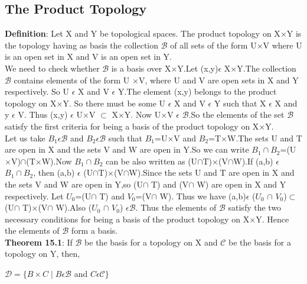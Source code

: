 \documentclass[a4paper,english,12pt]{article}
\begin{document}
\begin{flushleft}
\section{The Product Topology}
{\bf Definition}: Let X and Y be topological spaces. The product topology on X$\times$Y is the topology having as basis the collection $\mathscr{B}$ of all sets of the form U$\times$V where U is an open set in X and V is an open set in Y.\\
\vspace{1mm}
We need to check whether $\mathscr{B}$ is a basis over X$\times$Y.Let (x,y)$\epsilon$ X$\times$Y.The collection $\mathscr{B}$ contains elements of the form U $\times$V, where U and V are open sets in X and Y respectively. So U $\epsilon$ X and V $\epsilon$ Y.The element (x,y) belongs to the product topology on X$\times$Y. So there must be some U $\epsilon$ X and V $\epsilon$ Y such that X $\epsilon$ X and y $\epsilon$ V. Thus (x,y) $\epsilon$ U$\times$V $\subset$ X$\times$Y. Now U$\times$V $\epsilon$ $\mathscr{B}$.So the elements of the set $\mathscr{B}$ satisfy the first criteria for being a basis of the product topology on  X$\times$Y.\\
\vspace{1mm}
Let us take $B{_1}\epsilon\mathscr{B}$ and $B{_2}\epsilon\mathscr{B}$ such that $B{_1}$=U$\times$V and $B{_2}$=T$\times$W.The sets U and T are open in X and the sets V and W are open in Y.So we can write $B{_1}\cap B{_2}$=(U$\times$V)$\cap $(T$\times$W).Now $B{_1}\cap B{_2}$ can be also written as (U$\cap $T)$\times $(V$\cap $W).If (a,b) $\epsilon$ $B{_1}\cap B{_2}$, then (a,b) $\epsilon$ (U$\cap $T)$\times $(V$\cap $W).Since the sets
U and T are open in X and the sets V and W are open in Y,so (U$\cap$ T) and (V$\cap$ W) are open in X and Y respectively. Let $U_0$=(U$\cap$ T) and $V_0$=(V$\cap$ W). Thus we have (a,b)$\epsilon$ ($U_0$ $\cap $ $V_0$)$\subset$ (U$\cap$ T)$\times $(V$\cap$ W).Also ($U_0$ $\cap$ $V_0$) $\epsilon \mathscr{B}$. Thus the elements of $\mathscr{B}$ satisfy the two necessary conditions for being a basis of the product topology on X$\times$Y. Hence the elements of $\mathscr{B}$ form a basis.\\
\vspace{2mm}
{\bf Theorem 15.1}: If $\mathscr{B}$ be the basis for a topology on X and $\mathscr{C}$ be the basis for a topology on Y, then,\\
\vspace{1mm}
\begin{center}
$\mathscr{D}=\{B\times C\mid B \epsilon \mathscr{B}$ and $C \epsilon \mathscr{C}\}$\\

\end{center}
\end{flushleft}
\end{document}
